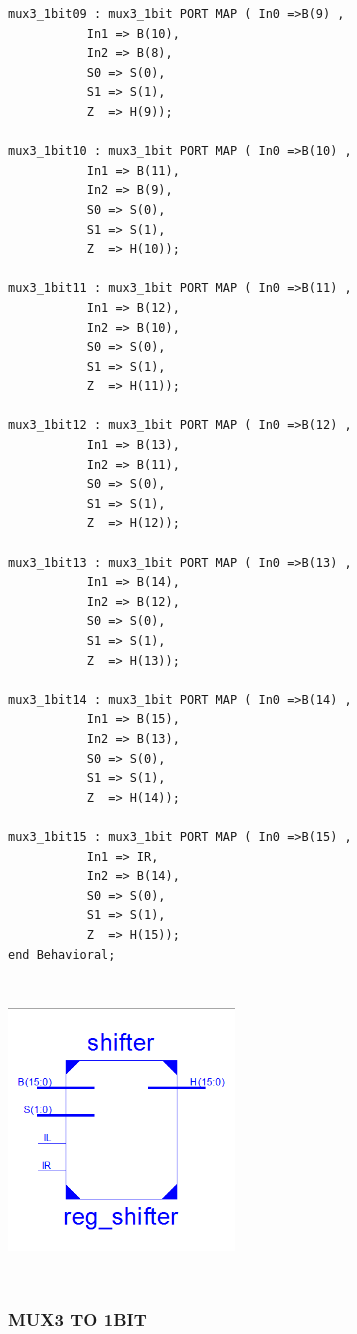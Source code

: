 \documentclass{article}
\begin{document}
\begin{lstlisting}
mux3_1bit09 : mux3_1bit PORT MAP ( In0 =>B(9) ,
           In1 => B(10), 
           In2 => B(8),
           S0 => S(0),
           S1 => S(1),
           Z  => H(9));
			  
mux3_1bit10 : mux3_1bit PORT MAP ( In0 =>B(10) ,
           In1 => B(11), 
           In2 => B(9),
           S0 => S(0),
           S1 => S(1),
           Z  => H(10));

mux3_1bit11 : mux3_1bit PORT MAP ( In0 =>B(11) ,
           In1 => B(12), 
           In2 => B(10),
           S0 => S(0),
           S1 => S(1),
           Z  => H(11));
			  
mux3_1bit12 : mux3_1bit PORT MAP ( In0 =>B(12) ,
           In1 => B(13), 
           In2 => B(11),
           S0 => S(0),
           S1 => S(1),
           Z  => H(12));

mux3_1bit13 : mux3_1bit PORT MAP ( In0 =>B(13) ,
           In1 => B(14), 
           In2 => B(12),
           S0 => S(0),
           S1 => S(1),
           Z  => H(13));
			  
mux3_1bit14 : mux3_1bit PORT MAP ( In0 =>B(14) ,
           In1 => B(15), 
           In2 => B(13),
           S0 => S(0),
           S1 => S(1),
           Z  => H(14));

mux3_1bit15 : mux3_1bit PORT MAP ( In0 =>B(15) ,
           In1 => IR, 
           In2 => B(14),
           S0 => S(0),
           S1 => S(1),
           Z  => H(15));
end Behavioral;
\end{lstlisting}

\includegraphics[width=6cm, height=8cm]{shifter.png}
\pagebreak


\subsubsection{MUX3 TO 1BIT}\label{sec:result}
\end{document}
